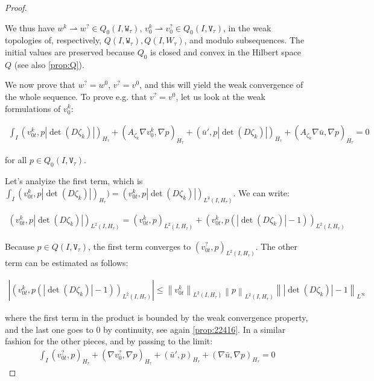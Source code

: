 \documentclass[english,a4paper,10pt,oneside]{scrbook}	%
\theoremstyle{break}
\newenvironment{mproof}[1][\proofname]{%
  \begin{proof}[#1]$ $\par\nobreak\ignorespaces
}{%
  \end{proof}
}
\renewcommand*{\proofname}{Proof}
\theoremstyle{remark}
\newcommand{\ds}{\displaystyle}
\newcommand{\norm}[1]{\left\lVert#1\right\rVert}
\newcommand{\weakc}{\rightharpoonup}
\newcommand{\tw}[1]{\texttt{#1}}
\begin{document}
\begin{mproof}
We thus have $w^k\weakc w^? \in Q_0(I, \tw{W}_{ \tau})$, $v_0^k \weakc v_0^? \in Q_0(I,\tw{V}_{\tau})$, in the weak topologies of, respectively, $Q(I, \tw{W}_{ \tau}), Q(I,W_{\tau})$, and modulo subsequences. The initial values are preserved because $Q_0$ is closed and convex in the Hilbert space $Q$ (see also \cref{prop:Q}). 

We now prove that $w^?=w^0$, $v^?=v^0$, and this will yield the weak convergence of the whole sequence.
To prove e.g. that $v^?=v^0$, let us look at the weak formulations of $v_0^k$:

\begin{align*}
\int_I (v_{0t}^k,p |\det(D\zeta_k)|)_{H_\tau} + (A_{\zeta_k} \nabla v_0^k, \nabla p)_{H_\tau}+(\bar{u}',p|\det(D\zeta_k)|)_{H_\tau}+(A_{\zeta_k} \nabla \bar{u} , \nabla p)_{H_\tau} = 0
\end{align*}

for all $p \in Q_0(I,\tw{V}_{\tau})$.

Let's analyize the first term, which is $\ds \int_I (v_{0t}^k,p |\det(D\zeta_k)|)_{H_\tau} ) =(v_{0t}^k,p |\det(D\zeta_k)|)_{L^2(I,H_\tau)}$.
We can write:

\begin{align*}
(v_{0t}^k,p |\det(D\zeta_k)|)_{L^2(I,H_\tau)} = (v_{0t}^k,p )_{L^2(I,H_\tau)} + (v_{0t}^k,p (|\det(D\zeta_k)|-1))_{L^2(I,H_\tau)}
\end{align*}

Because $p \in  Q(I,\tw{V}_{\tau})$, the first term converges to $(v_{0t}^?,p )_{L^2(I,H_\tau)}$. The other term can be estimated as follows:

\begin{align*}
|(v_{0t}^k,p (|\det(D\zeta_k)|-1))_{L^2(I,H_\tau)}|\leq\norm{v_{0t}^k}_{L^2(I,H_\tau)}\norm{p }_{L^2(I,H_\tau)} \norm{|\det(D\zeta_k)|-1}_{L^\infty}
\end{align*}

where the first term in the product is bounded by the weak convergence property, and the last one goes to $0$ by continuity, see again \cref{prop:22416}. 
In a similar fashion for the other pieces, and by passing to the limit:
\begin{align*}
\int_I (v_{0t}^?,p)_{H_\tau} + (\nabla v_0^?, \nabla p)_{H_\tau}+(\bar{u}',p)_{H_\tau}+(\nabla \bar{u} , \nabla p)_{H_\tau} = 0
\end{align*}


\end{mproof}
\end{document}
